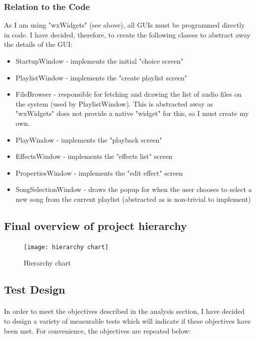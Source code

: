 \subsubsection{Relation to the Code}
As I am using "wxWidgets" (see above), all GUIs must be programmed directly in code. I have decided, therefore, to create the following classes to abstract away the details of the GUI:
\begin{itemize}
	\item StartupWindow - implements the initial "choice screen"
	\item PlaylistWindow - implements the "create playlist screen"
	\item FileBrowser - responsible for fetching and drawing the  list of audio files on the system (used by PlaylistWindow). This is abstracted away as "wxWidgets" does not provide a native "widget" for this, so I must create my own.
	\item PlayWindow - implements the "playback screen"
	\item EffectsWindow - implements the "effects list" screen
	\item PropertiesWindow - implements the "edit effect" screen
	\item SongSelectionWindow - draws the popup for when the user chooses to select a new song from the current playlist (abstracted as is non-trivial to implement)
\end{itemize}

\pagebreak
\subsection{Final overview of project hierarchy}
\begin{figure}[H]
	\texttt{[image: hierarchy chart]}
	\caption{Hierarchy chart }
\end{figure}

\pagebreak
\subsection{Test Design}
\paragraph{}
In order to meet the objectives described in the analysis section, I have decided to design a variety of measurable tests which will indicate if these objectives have been met. For convenience, the objectives are repeated below:

